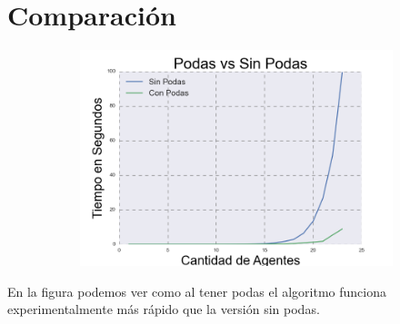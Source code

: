 \section{Comparación}

\begin{figure}[h]

\begin{subfigure}{0.5\textwidth}
\includegraphics[scale=0.45]{vs.png}
\end{subfigure}
\end{figure}
	En la figura podemos ver como al tener podas el algoritmo funciona experimentalmente más rápido que la versión sin podas.